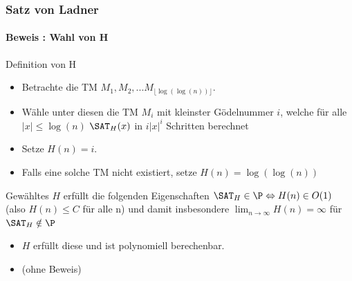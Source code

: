 \begin{frame}
	\frametitle{Satz von Ladner}
	\framesubtitle{Beweis : Wahl von H}
	\begin{KITinfoblock}{Definition von H}
		\begin{itemize}
		\item Betrachte die TM $M_1, M_2, ... M_{\lfloor \log(\log(n)) \rfloor}$. \newline
		\item Wähle unter diesen die TM $M_i$ mit kleinster Gödelnummer $i$, welche für alle
		$|x| \leq \log(n) $  ${\SAT}_H(x)$
		in $i|x|^i$ Schritten berechnet
		\item Setze $H(n) = i$. 
		\item Falls eine solche TM nicht existiert, setze $H(n) = \log(\log(n))$
		\end{itemize}
	\end{KITinfoblock}
	\pause
	\begin{KITblock}{Gewähltes $H$ erfüllt die folgenden Eigenschaften}
		${\SAT}_H \in \P \Leftrightarrow H(n) \in O(1)$ (also $H(n) \leq C$ f\"ur alle n) 				\newline
		und damit insbesondere $\lim_{n \to \infty}  H(n) = \infty$ f\"ur ${\SAT}_H
		\notin \P$
	\end{KITblock}
	\pause
	\begin{itemize}
	  \item  $H$ erfüllt diese und ist polynomiell berechenbar.
	  \item (ohne Beweis)
	\end{itemize}
		
\end{frame}
% 	
